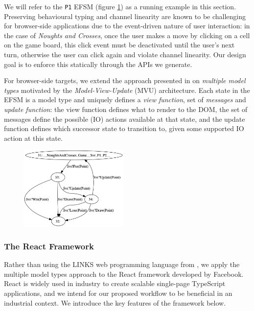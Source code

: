 \documentclass[submission,copyright,creativecommons]{eptcs}
\begin{document}
We will refer to the \texttt{P1} EFSM (figure \ref{fig:efsmp1}) as a running example in this section. Preserving behavioural typing and channel linearity are known to be challenging for browser-side applications due to the event-driven nature of user interaction: in the case of \textit{Noughts and Crosses}, once the user makes a move by clicking on a cell on the game board, this click event must be deactivated until the user's next turn, otherwise the user can click again and violate channel linearity. Our design goal is to enforce this statically through the APIs we generate. 

For browser-side targets, we extend the approach presented in \cite{MVU2019} on \textit{multiple model types} motivated by the \textit{Model-View-Update} (MVU) architecture. Each state in the EFSM is a model type and uniquely defines a \textit{view function}, set of \textit{messages} and \textit{update function}: the view function defines what to render to the DOM, the set of messages define the possible (IO) actions available at that state, and the update function defines which successor state to transition to, given some supported IO action at this state.


\begin{figure}
  \begin{center}
    \includegraphics[width=0.48\textwidth]{figures/efsm_p1.png}
  \end{center}

  \label{fig:efsmp1}
\end{figure}

\subsubsection{The React Framework}
Rather than using the LINKS web programming language from \cite{MVU2019}, we apply the multiple model types approach to the React framework \cite{React} developed by Facebook. React is widely used in industry to create scalable single-page TypeScript applications, and we intend for our proposed workflow to be beneficial in an industrial context. We introduce the key features of the framework below.
\end{document}
